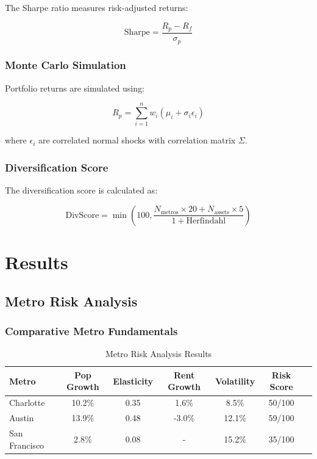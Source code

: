 ﻿\documentclass[12pt]{article}
\begin{document}
The Sharpe ratio measures risk-adjusted returns:

\begin{equation}
\text{Sharpe} = \frac{R_p - R_f}{\sigma_p}
\label{eq:sharpe}
\end{equation}

\subsubsection{Monte Carlo Simulation}

Portfolio returns are simulated using:

\begin{equation}
R_p = \sum_{i=1}^{n} w_i (\mu_i + \sigma_i \epsilon_i)
\label{eq:portfolio}
\end{equation}

where $\epsilon_i$ are correlated normal shocks with correlation matrix $\Sigma$.

\subsubsection{Diversification Score}

The diversification score is calculated as:

\begin{equation}
\text{DivScore} = \min\left(100, \frac{N_{\text{metros}} \times 20 + N_{\text{assets}} \times 5}{1 + \text{Herfindahl}}\right)
\label{eq:diversity}
\end{equation}

\section{Results}

\subsection{Metro Risk Analysis}

\subsubsection{Comparative Metro Fundamentals}

\begin{table}[H]
\centering
\caption{Metro Risk Analysis Results}
\label{tab:metro-results}
\begin{tabular}{@{}lcccccc@{}}
\toprule
\textbf{Metro} & \textbf{Pop Growth} & \textbf{Elasticity} & \textbf{Rent Growth} & \textbf{Volatility} & \textbf{Risk Score} \\
\midrule
Charlotte & 10.2\% & 0.35 & 1.6\% & 8.5\% & 50/100 \\
Austin & 13.9\% & 0.48 & -3.0\% & 12.1\% & 59/100 \\
San Francisco & 2.8\% & 0.08 & - & 15.2\% & 35/100 \\
\bottomrule
\end{tabular}
\end{table}
\end{document}
